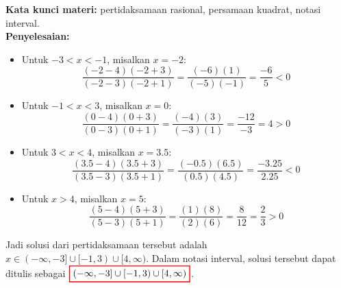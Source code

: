 \documentclass[10pt,openany,a4paper]{article}
\theoremstyle{definition}
\theoremstyle{definition}
\theoremstyle{plain}
\newenvironment{jawab}[2][tes]{
\textbf{Kata kunci materi:} #1.\\
\textbf{Penyelesaian:} #2
}{}
\begin{document}
\begin{enumerate}
\begin{jawab}[pertidaksamaan rasional, persamaan kuadrat, notasi interval]
{\begin{itemize}
        \[
        \frac{(-4-4)(-4+3)}{(-4-3)(-4+1)} = \frac{(-8)(-1)}{(-7)(-3)} = \frac{8}{21} > 0
        \]
        \item Untuk \(-3 < x < -1\), misalkan \(x = -2\):
        \[
        \frac{(-2-4)(-2+3)}{(-2-3)(-2+1)} = \frac{(-6)(1)}{(-5)(-1)} = \frac{-6}{5} < 0
        \]
        \item Untuk \(-1 < x < 3\), misalkan \(x = 0\):
        \[
        \frac{(0-4)(0+3)}{(0-3)(0+1)} = \frac{(-4)(3)}{(-3)(1)} = \frac{-12}{-3} = 4 > 0
        \]
        \item Untuk \(3 < x < 4\), misalkan \(x = 3.5\):
        \[
        \frac{(3.5-4)(3.5+3)}{(3.5-3)(3.5+1)} = \frac{(-0.5)(6.5)}{(0.5)(4.5)} = \frac{-3.25}{2.25} < 0
        \]
        \item Untuk \(x > 4\), misalkan \(x = 5\):
        \[
        \frac{(5-4)(5+3)}{(5-3)(5+1)} = \frac{(1)(8)}{(2)(6)} = \frac{8}{12} = \frac{2}{3} > 0
        \]
    \end{itemize}
    Jadi solusi dari pertidaksamaan tersebut adalah \(x \in (-\infty, -3] \cup [-1, 3) \cup [4, \infty)\). Dalam notasi interval, solusi tersebut dapat ditulis sebagai $\colorlet{oldcolor}{.}
        \color{red}
        \setlength{\fboxrule}{1pt} \boxed{\color{oldcolor}(-\infty, -3] \cup [-1, 3) \cup [4, \infty)}\color{oldcolor}$.
    }
        
    \end{jawab}


\end{enumerate}
\end{document}
